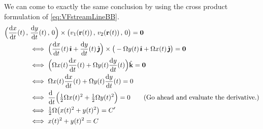 \begin{eg}
We can come to exactly the same conclusion by using the cross product 
formulation of \eqref{eq:VFstreamLineBB}.
\begin{align*}
&\Big(\diff{x}{t}(t)\,,\,\diff{y}{t}(t)\,,\,0\Big)\times
\big(v_1(\vr(t))\,,\,v_2(\vr(t))\,,\,0\big) = \vZero \\
&\hskip0.5in\iff \Big(\diff{x}{t}(t)\,\hi+\diff{y}{t}(t)\,\hj\Big)\times
\big(-\Om y(t)\,\hi+\Om x(t)\,\hj\big) = \vZero \\
&\hskip0.5in\iff \Big(\Om x(t)\diff{x}{t}(t) 
               +\Om y(t)\diff{y}{t}(t)\Big)\hk=\vZero \\
&\hskip0.5in\iff \Om x(t)\diff{x}{t}(t) 
               +\Om y(t)\diff{y}{t}(t)=0 \\
&\hskip0.5in\iff \diff{\ }{t}\Big(\half \Om x(t)^2+\half\Om y(t)^2\Big)=0 
\qquad\text{(Go ahead and evaluate the derivative.)}\\
&\hskip0.5in\iff \half\Om\big(x(t)^2+y(t)^2\big) = C' \\
&\hskip0.5in\iff x(t)^2+y(t)^2=C
\end{align*}
\end{eg}

